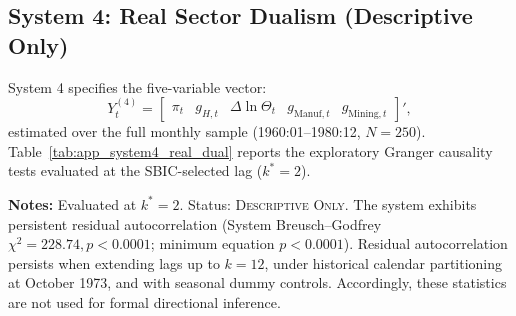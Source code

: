 \subsection{System 4: Real Sector Dualism (Descriptive Only)}
System 4 specifies the five-variable vector:
\begin{equation}
    Y^{(4)}_t = \begin{bmatrix} \pi_t & g_{H,t} & \Delta \ln \Theta_t & g_{\text{Manuf},t} & g_{\text{Mining},t} \end{bmatrix}',
\end{equation}
estimated over the full monthly sample (1960:01--1980:12, $N=250$). Table~\ref{tab:app_system4_real_dual} reports the exploratory Granger causality tests evaluated at the SBIC-selected lag ($k^*=2$).

\begin{table}[htbp]
\centering
\small
\renewcommand{\arraystretch}{0.90}
\caption{Exploratory Granger Tests: Real Sector Dualism ($N=250$, Full Sample)}
\label{tab:app_system4_real_dual}
\begin{minipage}{0.98\textwidth}
\vspace{0.3em}
\footnotesize \textbf{Notes:} Evaluated at $k^*=2$. Status: \textsc{Descriptive Only}. The system exhibits persistent residual autocorrelation (System Breusch--Godfrey $\chi^2 = 228.74, p < 0.0001$; minimum equation $p < 0.0001$). Residual autocorrelation persists when extending lags up to $k=12$, under historical calendar partitioning at October 1973, and with seasonal dummy controls. Accordingly, these statistics are not used for formal directional inference.
\end{minipage}
\end{table}

